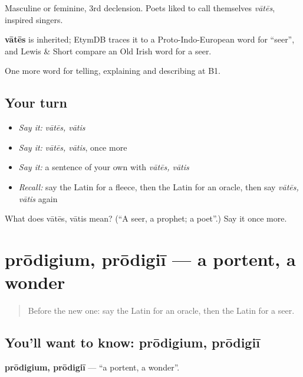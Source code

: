 Masculine or feminine, 3rd declension. Poets liked to call themselves \emph{vātēs}, inspired singers.

\begin{cousinweb}
\textbf{vātēs} is inherited; EtymDB traces it to a Proto-Indo-European word for \textquotedblleft{}seer\textquotedblright{}, and Lewis \& Short compare an Old Irish word for a seer.
\end{cousinweb}

\begin{grammarlens}[title={What you've built}]
One more word for telling, explaining and describing at B1.
\end{grammarlens}

\subsection*{Your turn}
\begin{itemize}
\raggedright
  \item \emph{Say it:} \emph{vātēs, vātis}
  \item \emph{Say it:} \emph{vātēs, vātis}, once more
  \item \emph{Say it:} a sentence of your own with \emph{vātēs, vātis}
  \item \emph{Recall:} say the Latin for a fleece, then the Latin for an oracle, then say \emph{vātēs, vātis} again
\end{itemize}

\begin{tcolorbox}[breakable,colback=teal!4,colframe=teal!35!black,title={Before you move on}]
What does vātēs, vātis mean? (\textquotedblleft{}A seer, a prophet; a poet\textquotedblright{}.) Say it once more.
\end{tcolorbox}
\section[prōdigium, prōdigiī]{prōdigium, prōdigiī — a portent, a wonder}

\label{lesson:LA-C348-prodigium}



\begin{quote}
Before the new one: say the Latin for an oracle, then the Latin for a seer.
\end{quote}

\subsection*{You'll want to know: prōdigium, prōdigiī}
\textbf{prōdigium, prōdigiī} — \textquotedblleft{}a portent, a wonder\textquotedblright{}.

